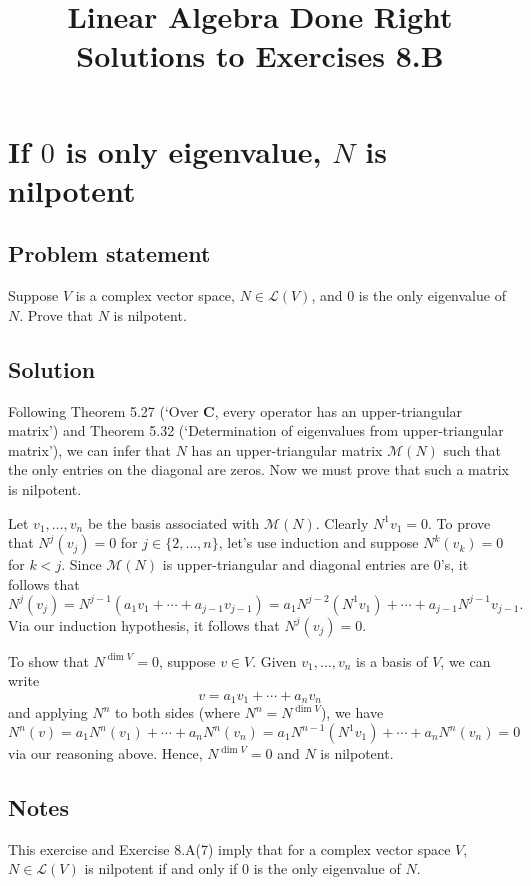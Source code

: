 \documentclass{article}
\title{Linear Algebra Done Right\\Solutions to Exercises 8.B}
\author{}
\date{}
\begin{document}
\maketitle

\section{If $0$ is only eigenvalue, $N$ is nilpotent}
\subsection*{Problem statement}
Suppose $V$ is a complex vector space, $N\in\mathcal{L}(V)$, and $0$ is the only eigenvalue of $N$. Prove that $N$ is nilpotent.

\subsection*{Solution}
Following Theorem 5.27 (`Over $\mathbf{C}$, every operator has an upper-triangular matrix') and Theorem 5.32 (`Determination of eigenvalues from upper-triangular matrix'), we can infer that $N$ has an upper-triangular matrix $\mathcal{M}(N)$ such that the only entries on the diagonal are zeros. Now we must prove that such a matrix is nilpotent.

Let $v_1,\ldots,v_n$ be the basis associated with $\mathcal{M}(N)$. Clearly $N^1v_1=0$. To prove that $N^j(v_j)=0$ for $j\in\{2,\ldots,n\}$, let's use induction and suppose $N^k(v_k)=0$ for $k<j$. Since $\mathcal{M}(N)$ is upper-triangular and diagonal entries are $0$'s, it follows that 
\[N^j(v_j)=N^{j-1}(a_1v_1+\cdots+a_{j-1}v_{j-1})=a_1N^{j-2}(N^1v_1)+\cdots+a_{j-1}N^{j-1}v_{j-1}.\]
Via our induction hypothesis, it follows that $N^j(v_j)=0$.

To show that $N^{\operatorname{dim}V}=0$, suppose $v\in V$. Given $v_1,\ldots,v_n$ is a basis of $V$, we can write
\[v=a_1v_1+\cdots+a_nv_n\]
and applying $N^n$ to both sides (where $N^n=N^{\operatorname{dim}V}$), we have
\[N^n(v)=a_1N^n(v_1)+\cdots+a_nN^n(v_n)=a_1N^{n-1}(N^1v_1)+\cdots+a_nN^n(v_n)=0\]
via our reasoning above. Hence, $N^{\operatorname{dim}V}=0$ and $N$ is nilpotent.

\subsection*{Notes}
This exercise and Exercise 8.A(7) imply that for a complex vector space $V$, $N\in\mathcal{L}(V)$ is nilpotent if and only if $0$ is the only eigenvalue of $N$.
\end{document}
